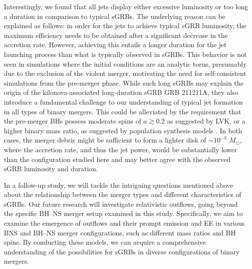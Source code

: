 \documentclass[twocolumn,dvipsnames]{aastex62}
\newcommand{\msun}{\,{M_{\odot}}}
\begin{document}
Interestingly, we found that all jets display either excessive luminosity or too long a duration in comparison to typical sGRBs. The underlying reason can be explained as follows: in order for the jets to achieve typical sGRB luminosity, the maximum efficiency needs to be obtained after a significant decrease in the accretion rate. However, achieving this entails a longer duration for the jet launching process than what is typically observed in sGRBs. This behavior is not seen in simulations where the initial conditions are an analytic torus, presumably due to the exclusion of the violent merger, motivating the need for self-consistent simulations from the pre-merger phase. While such long sGRBs may explain the origin of the kilonova-associated long-duration sGRB GRB 211211A, they also introduce a fundamental challenge to our understanding of typical jet formation in all types of binary mergers. This could be alleviated by the requirement that the pre-merger BHs possess moderate spins of $ a \gtrsim 0.2 $ as suggested by LVK, or a higher binary mass ratio, as suggested by population synthesis models \citep{Belczynski2008}. In both cases, the merger debris might be sufficient to form a lighter disk of $ \sim 10^{-3}\,\msun $, where the accretion rate, and thus the jet power, would be substantially lower than the configuration studied here and may better agree with the observed sGRB luminosity and duration.

In a follow-up study, we will tackle the intriguing questions mentioned above about the relationship between the merger types and different characteristics of sGRBs. Our future research will investigate relativistic outflows, going beyond the specific BH--NS merger setup examined in this study. Specifically, we aim to examine the emergence of outflows and their prompt emission and EE in various BNS and BH--NS merger configurations, such as different mass ratios and BH spins. By conducting these models, we can acquire a comprehensive understanding of the possibilities for sGRBs in diverse configurations of binary mergers.
\end{document}
